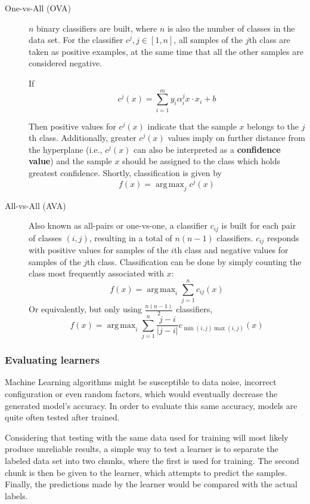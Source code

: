 \documentclass[12pt]{article}
\DeclareMathOperator*{\argmax}{arg\,max}
\begin{document}
\begin{description}
	\item[One-vs-All (OVA)] $n$ binary classifiers are built, where $n$ is also the number of classes in the data set. For the classifier $c^j, j \in [1, n]$, all samples of the $j$th class are taken as positive examples, at the same time that all the other samples are considered negative.

	If
	$$c^j(x) = \sum_{i=1}^{m} y_i \alpha_i^j x \cdot x_i + b$$

	Then positive values for $c^j(x)$ indicate that the sample $x$ belongs to the $j$th class. Additionally, greater $c^j(x)$ values imply on further distance from the hyperplane (i.e., $c^j(x)$ can also be interpreted as a \textbf{confidence value}) and the sample $x$ should be assigned to the class which holds greatest confidence. \cite{ovacj} Shortly, classification is given by
	$$ f(x) = \argmax_j{c^j(x)} $$
	\item[All-vs-All (AVA)] Also known as all-pairs or one-vs-one, a classifier $c_{ij}$ is built for each pair of classes $(i, j)$, resulting in a total of $n(n-1)$ classifiers. $c_{ij}$ responds with positive values for samples of the $i$th class and negative values for samples of the $j$th class. Classification can be done by simply counting the class most frequently associated with $x$:
	$$ f(x) = \argmax_i{\sum_{j=1}^{n} c_{ij}(x)} $$
	Or equivalently, but only using $\frac{n(n-1)}{2}$ classifiers,
	$$ f(x) = \argmax_i{\sum_{j=1}^{n} \frac{j-i}{|j-i|} c_{\min(i, j) \max(i, j)}(x)} $$
\end{description}

\subsubsection{Evaluating learners}

Machine Learning algorithms might be susceptible to data noise, incorrect configuration or even random factors, which would eventually decrease the generated model's accuracy. In order to evaluate this same accuracy, models are quite often tested after trained.

Considering that testing with the same data used for training will most likely produce unreliable results, a simple way to test a learner is to separate the labeled data set into two chunks, where the first is used for training. The second chunk is then be given to the learner, which attempts to predict the samples. Finally, the predictions made by the learner would be compared with the actual labels.
\end{document}
